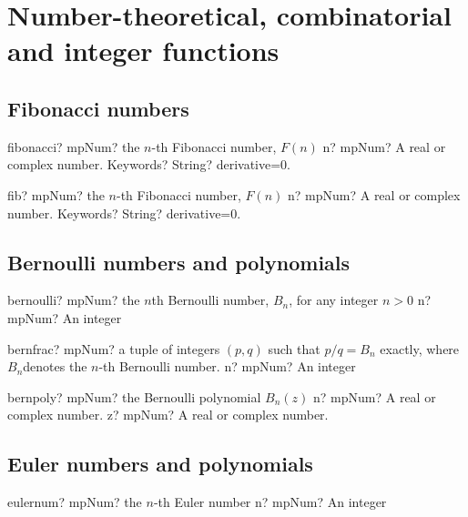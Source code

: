 \documentclass[12pt,a4paper,openany]{book}
\begin{document}
\chapter{Number-theoretical, combinatorial and integer functions}

\section{Fibonacci numbers}

\begin{mpFunctionsExtract}
\mpFunctionTwo
{fibonacci? mpNum? the $n$-th Fibonacci number, $F(n)$}
{n? mpNum? A real or complex number.}
{Keywords? String? derivative=0.}
\end{mpFunctionsExtract}

\begin{mpFunctionsExtract}
\mpFunctionTwo
{fib? mpNum? the $n$-th Fibonacci number, $F(n)$}
{n? mpNum? A real or complex number.}
{Keywords? String? derivative=0.}
\end{mpFunctionsExtract}

\section{Bernoulli numbers and polynomials}

\begin{mpFunctionsExtract}
\mpFunctionOne
{bernoulli? mpNum? the $n$th Bernoulli number, $B_n$, for any integer $n>0$}
{n? mpNum? An integer}
\end{mpFunctionsExtract}

\begin{mpFunctionsExtract}
\mpFunctionOne
{bernfrac? mpNum? a tuple of integers $(p,q)$ such that $p/q=B_n$ exactly, where $B_n$denotes the $n$-th Bernoulli number.}
{n? mpNum? An integer}
\end{mpFunctionsExtract}

\begin{mpFunctionsExtract}
\mpFunctionTwo
{bernpoly? mpNum? the Bernoulli polynomial $B_n(z)$}
{n? mpNum? A real or complex number.}
{z? mpNum? A real or complex number.}
\end{mpFunctionsExtract}

\section{Euler numbers and polynomials}

\begin{mpFunctionsExtract}
\mpFunctionOne
{eulernum? mpNum? the $n$-th Euler number}
{n? mpNum? An integer}
\end{mpFunctionsExtract}
\end{document}
